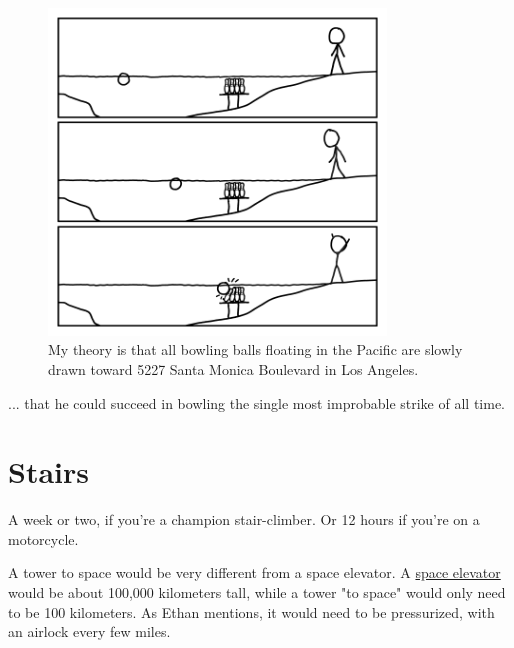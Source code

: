 {\begin{figure}[!htbp]
\centering
\includegraphics[scale=0.5, max width=0.8\textwidth]{imgs/a/125/strike.png}
\caption{My theory is that all bowling balls floating in the Pacific are slowly drawn toward 5227 Santa Monica Boulevard in Los Angeles.}
\end{figure}

{... that he could succeed in bowling the single most improbable strike of all time.}

{
\chapter{Stairs}
}

\hfill{}

{A week or two, if you're a champion stair-climber. Or 12 hours if you're on a motorcycle.}

{A tower to space would be very different from a space elevator. A \href{https://en.wikipedia.org/wiki/Space\_elevator}{space elevator} would be about 100,000 kilometers tall, while a tower "to space" would only need to be 100 kilometers. As Ethan mentions, it would need to be pressurized, with an airlock every few miles.}

}
